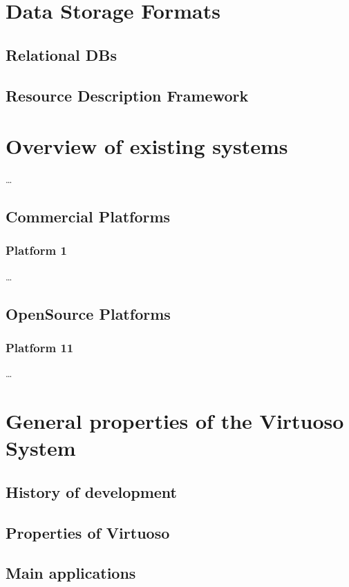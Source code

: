 \section{Data Storage Formats}
\subsection{Relational DBs}

\subsection{Resource Description Framework}
\label{sec:RDF}

\section{Overview of existing systems}
\ldots

\subsection{Commercial Platforms}
\label{sec:commercial_platforms}

\subsubsection{Platform 1}
\ldots

\subsection{OpenSource Platforms}
\label{sec:open_source_platforms}

\subsubsection{Platform 11}
\ldots

\section{General properties of the Virtuoso System}
\subsection{History of development}
\subsection{Properties of Virtuoso}
\subsection{Main applications}
